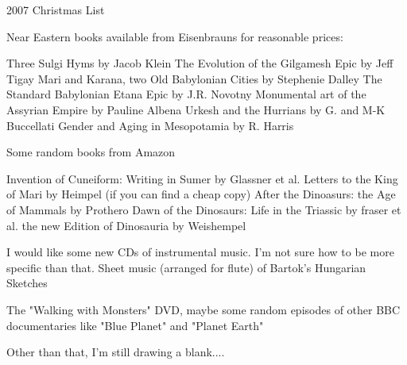 2007 Christmas List


Near Eastern books available from Eisenbrauns for reasonable prices:

Three Sulgi Hyms by Jacob Klein
The Evolution of the Gilgamesh Epic by Jeff Tigay
Mari and Karana, two Old Babylonian Cities by Stephenie Dalley
The Standard Babylonian Etana Epic by J.R. Novotny
Monumental art of the Assyrian Empire by Pauline Albena
Urkesh and the Hurrians by G. and M-K Buccellati
Gender and Aging in Mesopotamia by R. Harris

Some random books from Amazon

Invention of Cuneiform: Writing in Sumer by Glassner et al.
Letters to the King of Mari by Heimpel (if you can find a cheap copy)
After the Dinoasurs: the Age of Mammals by Prothero
Dawn of the Dinosaurs: Life in the Triassic by fraser et al.
the new Edition of Dinosauria by Weishempel

I would like some new CDs of instrumental music. I'm not sure how to be more specific than that.
Sheet music (arranged for flute) of Bartok's Hungarian Sketches

 The "Walking with Monsters"  DVD, maybe some random episodes of other BBC documentaries like "Blue Planet" and "Planet Earth" 
 
 Other than that, I'm still drawing a blank....
